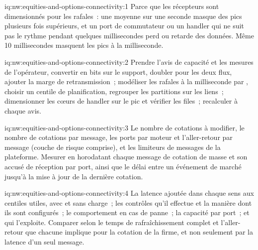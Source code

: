\begin{solution}{iq:nw:equities-and-options-connectivity:1}
Parce que les récepteurs sont dimensionnés pour les rafales~: une moyenne sur une seconde masque des pics plusieurs fois supérieurs, et un port de commutateur ou un handler qui
 ne suit pas le rythme pendant quelques millisecondes perd ou retarde des données. Même 10 millisecondes masquent les pics à la milliseconde.
\end{solution}

\begin{solution}{iq:nw:equities-and-options-connectivity:2}
Prendre l'avis de capacité et les mesures de l'opérateur, convertir en bits sur le support, doubler pour les deux flux, ajouter la marge de retransmission~;
modéliser les rafales à la milliseconde par , choisir un centile de planification, regrouper les partitions sur les liens~; dimensionner les cœurs de handler sur le pic
et vérifier les files~; recalculer à chaque avis.
\end{solution}

\begin{solution}{iq:nw:equities-and-options-connectivity:3}
Le nombre de cotations à modifier, le nombre de cotations par message, les ports par moteur et l'aller-retour par message (couche de risque comprise),
et les limiteurs de messages de la plateforme. Mesurer en horodatant chaque message de cotation de masse et son accusé de réception par port, ainsi que le délai entre un événement de marché
jusqu'à la mise à jour de la dernière cotation.
\end{solution}

\begin{solution}{iq:nw:equities-and-options-connectivity:4}
La latence ajoutée dans chaque sens aux centiles utiles, avec et sans charge~; les contrôles qu'il effectue et la manière dont ils sont configurés~;
le comportement en cas de panne~; la capacité par port~; et qui l'exploite. Comparer selon le temps de rafraîchissement complet et l'aller-retour que chacune implique pour la
cotation de la firme, et non seulement par la latence d'un seul message.
\end{solution}


